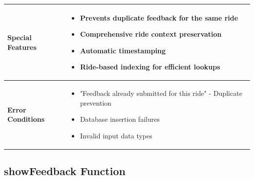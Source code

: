 \documentclass[11pt,a4paper]{article}
\begin{document}
\begin{longtable}{|p{3cm}|p{12cm}|}
\hline
\textbf{Special Features} & 
\begin{itemize}[nosep]
\item Prevents duplicate feedback for the same ride
\item Comprehensive ride context preservation
\item Automatic timestamping
\item Ride-based indexing for efficient lookups
\end{itemize} \\
\hline
\textbf{Error Conditions} & 
\begin{itemize}[nosep]
\item "Feedback already submitted for this ride" - Duplicate prevention
\item Database insertion failures
\item Invalid input data types
\end{itemize} \\
\hline
\end{longtable}

\subsection{showFeedback Function}
\end{document}
